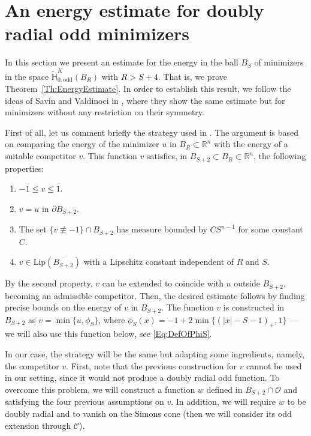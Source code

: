 \documentclass[12pt,reqno]{amsart}
\theoremstyle{definition}
\theoremstyle{remark}
\newcommand{\con}[1]{\mathbb{#1}}
\newcommand{\R}{\con{R}} %
\renewcommand{\H}{\con{H}}
\newcommand{\ccal}{\mathscr{C}}
\newcommand{\ocal}{\mathcal{O}}
\newcommand{\Lip}{\mathrm{Lip}}
\numberwithin{equation}{section}
\begin{document}
\section{An energy estimate for doubly radial odd minimizers}
\label{Sec:EnergyEstimate}

In this section we present an estimate for the energy in the ball $B_S$ of minimizers in the space $\widetilde{\H}^K_{0, \mathrm{odd}}(B_R)$ with $R > S+ 4$. That is, we prove Theorem~\ref{Th:EnergyEstimate}. In order to establish this result, we follow the ideas of Savin and Valdinoci in \cite{SavinValdinoci-EnergyEstimate}, where they show the same estimate but for minimizers without any restriction on their symmetry.


First of all, let us comment briefly the strategy used in \cite{SavinValdinoci-EnergyEstimate}. The argument is based on comparing the energy of the minimizer $u$ in $B_R\subset \R^n$ with the energy of a suitable competitor $v$. This function $v$ satisfies, in $B_{S+2}\subset B_R \subset \R^n$, the following properties:
\begin{enumerate}[label=(\textit{\roman*})]
	\item $-1 \leq v \leq 1$.
	\item $v=u$ in $\partial B_{S+2}$.
	\item The set $\{v\not \equiv -1\}\cap B_{S+2}$ has measure bounded by $C S^{n-1}$ for some constant $C$.
	\item $v\in \Lip(\overline{B_{S+2}})$ with a Lipschitz constant independent of $R$ and $S$.
\end{enumerate} 
By the second property, $v$ can be extended to coincide with $u$ outside $B_{S+2}$, becoming an admissible competitor. Then, the desired estimate follows by finding precise bounds on the energy of $v$ in $B_{S+2}$. The function $v$ is constructed in $B_{S+2}$ as $v = \min \{u, \phi_S\}$, where $\phi_S (x) =-1+2\min\{(|x|-S-1)_+,1\}$ ---we will also use this function below, see \eqref{Eq:DefOfPhiS}.

In our case, the strategy will be the same but adapting some ingredients, namely, the competitor $v$. First, note that the previous construction for $v$ cannot be used in our setting, since it would not produce a doubly radial odd function. To overcome this problem, we will construct a function $w$ defined in $B_{S+2}\cap \ocal$ and satisfying the four previous assumptions on $v$. In addition, we will require $w$ to be doubly radial and to vanish on the Simons cone (then we will consider its odd extension through $\ccal$).
\end{document}
